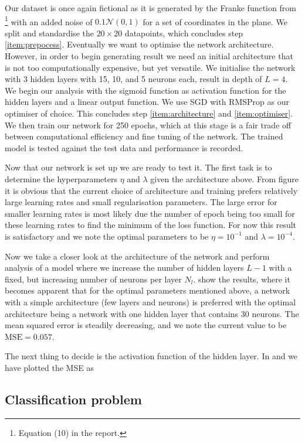     Our dataset is once again fictional as it is generated by the Franke function from \projectOne\footnote{Equation (10) in the report.} with an added noise of $0.1 \mathcal{N}(0, 1)$ for a set of coordinates in the plane. We split and standardise the $20\times 20$ datapoints, which concludes step \ref{item:prepocess}. 
    Eventually we want to optimise the network architecture. However, in order to begin generating result we need an initial architecture that is not too computationally expensive, but yet versatile. We initialise the network with 3 hidden layers with 15, 10, and 5 neurons each, result in depth of $L=4$. We begin our analysis with the sigmoid function as activation function for the hidden layers and a linear output function. We use SGD with RMSProp as our optimiser of choice. This concludes step \ref{item:architecture} and \ref{item:optimiser}.
    We then train our network for 250 epochs, which at this stage is a fair trade off between computational efficiency and fine tuning of the network. The trained model is tested against the test data and performance is recorded. 

    Now that our network is set up we are ready to test it. The first task is to determine the hyperparameters $\eta$ and $\lambda$ given the architecture above. From figure  it is obvious that the current choice of architecture and training prefers relatively large learning rates and small regularisation parameters. The large error for smaller learning rates is most likely due the number of epoch being too small for these learning rates to find the minimum of the loss function. For now this result is satisfactory and we note the optimal parameters to be $\eta=10^{-1}$ and $\lambda=10^{-4}$. 

    Now we take a closer look at the architecture of the network and perform analysis of a model where we increase the number of hidden layers $L-1$ with a fixed, but increasing number of neurons per layer $N_l$.  show the results, where it becomes apparent that for the optimal parameters mentioned above, a network with a simple architecture (few layers and neurons) is preferred with the optimal architecture being a network with one hidden layer that contains 30 neurons. The mean squared error is steadily decreasing, and we note the current value to be $\mathrm{MSE} = 0.057$. 

    The next thing to decide is the activation function of the hidden layer. In  and  we have plotted the MSE as 

  






\subsection{Classification problem}\label{sec:analysis_classification}



